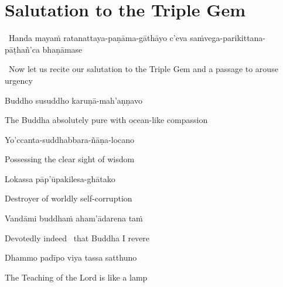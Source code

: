 \section{Salutation to the Triple Gem}
\label{salutation}

\begin{leader}
  \anglebracketleft\ \hspace{-0.5mm}Handa mayaṁ ratanattaya-paṇāma-gāthāyo c'eva saṁvega-parikittana-pāṭhañ'ca bhaṇāmase \hspace{-0.5mm}\anglebracketright\
\end{leader}
\begin{leader-english-belowpali}
  \anglebracketleft\ \hspace{-0.5mm}Now let us recite our salutation to the Triple Gem and a passage to arouse urgency \hspace{-0.5mm}\anglebracketright\
\end{leader-english-belowpali}

Buddho susuddho karuṇā-mah'aṇṇavo

\begin{english}
  The Buddha absolutely pure with ocean-like compassion
\end{english}

Yo'ccanta-suddhabbara-ñāṇa-locano

\begin{english}
  Possessing the clear sight of wisdom
\end{english}

Lokassa pāp'ūpakilesa-ghātako

\begin{english}
  Destroyer of worldly self-corruption
\end{english}

Vandāmi buddhaṁ aham'ādarena taṁ

\begin{english}
  Devotedly indeed \breathmark\ that Buddha I revere
\end{english}

Dhammo padīpo viya tassa satthuno

\begin{english}
  The Teaching of the Lord is like a lamp\ifdigitalversion\makeatletter\hyperlink{endnote8-appendix}\makeatother\fi
\end{english}


